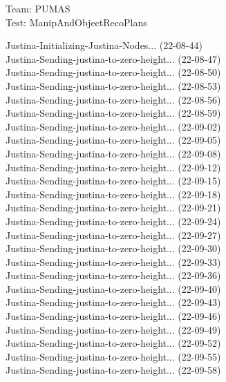 \documentclass{article}
\begin{document}
\begin{center}
Team: PUMAS\\
Test: ManipAndObjectRecoPlans\\
\end{center}
Justina-Initializing-Justina-Nodes... (22-08-44) \\
Justina-Sending-justina-to-zero-height... (22-08-47) \\
Justina-Sending-justina-to-zero-height... (22-08-50) \\
Justina-Sending-justina-to-zero-height... (22-08-53) \\
Justina-Sending-justina-to-zero-height... (22-08-56) \\
Justina-Sending-justina-to-zero-height... (22-08-59) \\
Justina-Sending-justina-to-zero-height... (22-09-02) \\
Justina-Sending-justina-to-zero-height... (22-09-05) \\
Justina-Sending-justina-to-zero-height... (22-09-08) \\
Justina-Sending-justina-to-zero-height... (22-09-12) \\
Justina-Sending-justina-to-zero-height... (22-09-15) \\
Justina-Sending-justina-to-zero-height... (22-09-18) \\
Justina-Sending-justina-to-zero-height... (22-09-21) \\
Justina-Sending-justina-to-zero-height... (22-09-24) \\
Justina-Sending-justina-to-zero-height... (22-09-27) \\
Justina-Sending-justina-to-zero-height... (22-09-30) \\
Justina-Sending-justina-to-zero-height... (22-09-33) \\
Justina-Sending-justina-to-zero-height... (22-09-36) \\
Justina-Sending-justina-to-zero-height... (22-09-40) \\
Justina-Sending-justina-to-zero-height... (22-09-43) \\
Justina-Sending-justina-to-zero-height... (22-09-46) \\
Justina-Sending-justina-to-zero-height... (22-09-49) \\
Justina-Sending-justina-to-zero-height... (22-09-52) \\
Justina-Sending-justina-to-zero-height... (22-09-55) \\
Justina-Sending-justina-to-zero-height... (22-09-58) \\
\end{document}
